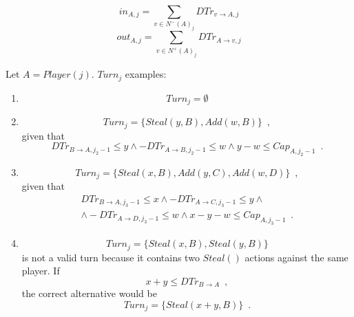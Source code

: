 \documentclass[11pt]{llncs}
\theoremstyle{definition}
\begin{document}
     \begin{definition}
     \label{inouttrust}
        \begin{equation}
           in_{A, j} = \sum\limits_{v \in N^{-}\left(A\right)_j}DTr_{v \rightarrow A, j}
        \end{equation}
        \begin{equation}
           out_{A, j} = \sum\limits_{v \in N^{+}\left(A\right)_j}DTr_{A \rightarrow v, j}
        \end{equation}
     \end{definition}
     
     Let $A = Player(j)$. $Turn_j$ examples:
     \begin{enumerate}
        \item \begin{equation*}
           Turn_j = \emptyset
        \end{equation*}
        \item \begin{equation*}
           Turn_j = \{Steal\left(y, B\right), Add\left(w, B\right)\} \enspace,
        \end{equation*}
        given that
        \begin{equation*}
           DTr_{B \rightarrow A, j_2 - 1} \leq y \wedge -DTr_{A \rightarrow B, j_2 - 1} \leq w \wedge y - w \leq
           Cap_{A, j_2-1} \enspace.
        \end{equation*}
        \item \begin{equation*}
           Turn_j = \{Steal\left(x, B\right), Add\left(y, C\right), Add\left(w, D\right)\} \enspace,
        \end{equation*}
        given that
        \begin{equation*}
        \begin{gathered}
           DTr_{B \rightarrow A, j_3 - 1} \leq x \wedge -DTr_{A \rightarrow C, j_3-1} \leq y \wedge \\
           \wedge -DTr_{A \rightarrow D, j_3 - 1} \leq w \wedge x - y - w \leq Cap_{A, j_3-1} \enspace.
        \end{gathered}
        \end{equation*}
        \item \begin{equation*}
           Turn_j = \{Steal\left(x, B\right), Steal\left(y, B\right)\}
        \end{equation*}
        is not a valid turn because it contains two $Steal\left(\right)$ actions against the same player. If
        \begin{equation*}
           x + y \leq DTr_{B \rightarrow A} \enspace,
        \end{equation*}
        the correct alternative would be
        \begin{equation*}
           Turn_j = \{Steal\left(x+y, B\right)\} \enspace.
        \end{equation*}
     \end{enumerate}
\end{document}
